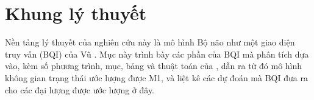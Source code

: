 \section{Khung lý thuyết}
\label{sec:theory}
Nền tảng lý thuyết của nghiên cứu này là mô hình Bộ não như một giao diện truy vấn (BQI) của Vũ \cite{BQI}. Mục này trình bày các phần của BQI mà phân tích dựa vào, kèm số phương trình, mục, bảng và thuật toán của \cite{BQI}, dẫn ra từ đó mô hình không gian trạng thái ước lượng được M1, và liệt kê các dự đoán mà BQI đưa ra cho các đại lượng được ước lượng ở đây.

